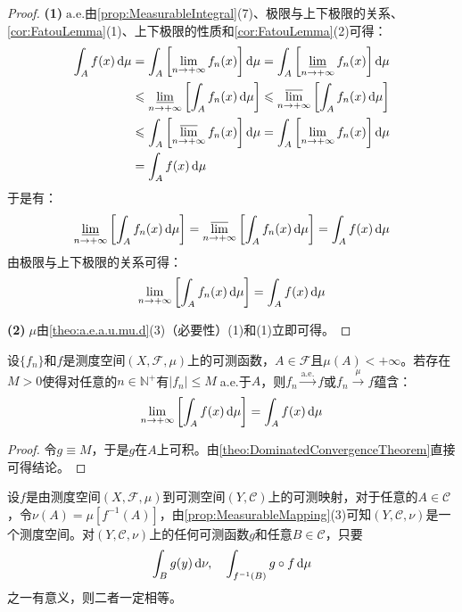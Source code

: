 \begin{proof}
	\textbf{(1)$\;\text{a.e.}$}由\cref{prop:MeasurableIntegral}(7)、极限与上下极限的关系、\cref{cor:FatouLemma}(1)、上下极限的性质和\cref{cor:FatouLemma}(2)可得：
	\begin{align*}
		\int_{A}f(x)\dif\mu&=\int_{A}\left[\lim_{n\to+\infty}f_n(x)\right]\dif\mu=\int_{A}\left[\varliminf_{n\to+\infty}f_n(x)\right]\dif\mu \\
		&\leqslant\varliminf_{n\to+\infty}\left[\int_{A}f_n(x)\dif\mu\right]\leqslant\varlimsup_{n\to+\infty}\left[\int_{A}f_n(x)\dif\mu\right] \\
		&\leqslant\int_{A}\left[\varlimsup_{n\to+\infty}f_n(x)\right]\dif\mu=\int_{A}\left[\lim_{n\to+\infty}f_n(x)\right]\dif\mu \\
		&=\int_{A}f(x)\dif\mu
	\end{align*}
	于是有：
	\begin{equation*}
		\varliminf_{n\to+\infty}\left[\int_{A}f_n(x)\mathop{}\!\mathrm{d}\mu\right]=\varlimsup_{n\to+\infty}\left[\int_{A}f_n(x)\mathop{}\!\mathrm{d}\mu\right]=\int_{A}f(x)\mathop{}\!\mathrm{d}\mu
	\end{equation*}
	由极限与上下极限的关系可得：
	\begin{equation*}
		\lim_{n\to+\infty}\left[\int_{A}f_n(x)\mathop{}\!\mathrm{d}\mu\right]=\int_{A}f(x)\mathop{}\!\mathrm{d}\mu
	\end{equation*}\par
	\textbf{(2)$\;\mu$}由\cref{theo:a.e.a.u.mu.d}(3)（必要性）(1)和(1)立即可得。
\end{proof}
\begin{corollary}[Lebesgue有界收敛定理]
	设$\{f_n\}$和$f$是测度空间$(X,\mathscr{F},\mu)$上的可测函数，$A\in\mathscr{F}$且$\mu(A)<+\infty$。若存在$M>0$使得对任意的$n\in\mathbb{N}^+$有$|f_n|\leqslant M\;$a.e.于$A$，则$f_n\overset{\text{a.e.}}{\longrightarrow}f$或$f_n\overset{\mu}{\longrightarrow}f$蕴含：
	\begin{equation*}
		\lim_{n\to+\infty}\left[\int_{A}f(x)\mathop{}\!\mathrm{d}\mu\right]=\int_{A}f(x)\mathop{}\!\mathrm{d}\mu
	\end{equation*}
\end{corollary}
\begin{proof}
	令$g\equiv M$，于是$g$在$A$上可积。由\cref{theo:DominatedConvergenceTheorem}直接可得结论。
\end{proof}
\begin{theorem}
	设$f$是由测度空间$(X,\mathscr{F},\mu)$到可测空间$(Y,\mathscr{C})$上的可测映射，对于任意的$A\in\mathscr{C}$，令$\nu(A)=\mu[f^{-1}(A)]$，由\cref{prop:MeasurableMapping}(3)可知$(Y,\mathscr{C},\nu)$是一个测度空间。对$(Y,\mathscr{C},\nu)$上的任何可测函数$g$和任意$B\in\mathscr{C}$，只要
	\begin{equation*}
		\int_Bg(y)\mathop{}\!\mathrm{d}\nu,\quad\int_{f^{-1}(B)}g\circ f\mathop{}\!\mathrm{d}\mu
	\end{equation*}
	之一有意义，则二者一定相等。
\end{theorem}
